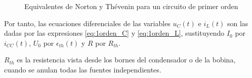 \begin{figure}[H]
  \centering {}\hfil
  \caption{Equivalentes de Norton y Thévenin para un circuito de
    primer orden}
  \label{fig:thevenin_1orden}
\end{figure}
Por tanto, las ecuaciones diferenciales de las variables $u_C(t)$ e
$i_L(t)$ son las dadas por las expresiones \eqref{eq:1orden_C} y
\eqref{eq:1orden_L}, sustituyendo $I_0$ por $i_{CC}(t)$, $U_0$ por
$\epsilon_{th}(t)$ y $R$ por $R_{th}$.
	
\begin{remark}
  $R_{th}$ es la resistencia vista desde los bornes del condensador o
  de la bobina, cuando se anulan todas las fuentes independientes.
\end{remark}
	
